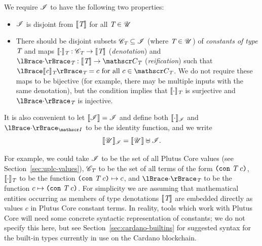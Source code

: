 \medskip
\noindent We require $\mathscr{I}$ to have the following two properties:
\begin{itemize}
\item $\mathscr{I}$ is disjoint from $\llbracket\mathit{\textit{T}}\rrbracket$ for all $\textit{T} \in \mathscr{U}$
\item There should be disjoint subsets $\mathscr{C}_{\textit{T}} \subseteq \mathscr{I}$ (where $\textit{T}
  \in \mathscr{U}$) of \textit{constants of type $\textit{T}$} and maps $\llbracket\mathit{\cdot}\rrbracket_{\textit{T}}:
  \mathscr{C}_{\textit{T}} \rightarrow \llbracket\mathit{\textit{T}}\rrbracket$ (\textit{denotation}) and
  $\reify{\cdot}_{\tn}: \denote{\tn} \rightarrow \Con{\tn}$
  (\textit{reification}) such that $\reify{\denote{c}_{\tn}}_{\tn} = c \text{
    for all } c \in \Con{\tn}$.  We do not require these maps to be bijective
  (for example, there may be multiple inputs with the same denotation), but the
  condition implies that $\llbracket\mathit{\cdot}\rrbracket_{\textit{T}}$ is surjective and
  $\reify{\cdot}_{\tn}$ is injective.
\end{itemize}%
%
%

\noindent It is also convenient to let $\llbracket\mathit{\mathscr{I}}\rrbracket = \mathscr{I}$ and define both
  $\llbracket\mathit{\cdot}\rrbracket_{\mathscr{I}}$ and $\reify{\cdot}_{\Inputs}$ to be the identity
function, and we write
$$
\llbracket\mathit{\mathscr{U}}\rrbracket_{\mathscr{I}} = \llbracket\mathit{\mathscr{U}}\rrbracket \uplus \mathscr{I}.
$$


\noindent For example, we could take $\mathscr{I}$ to be the set of all Plutus Core
values (see Section~\ref{sec:uplc-values}), $\mathscr{C}_{\textit{T}}$ to be the set of all
terms of the form $\texttt{(} \texttt{con} ~ \textit{T} ~ c \texttt{)}$, $\llbracket\mathit{\cdot}\rrbracket_{\textit{T}}$ to be the function
$\texttt{(} \texttt{con} ~ \textit{T} ~ c \texttt{)} \mapsto c$, and $\reify{\cdot}_{\tn}$ to be the function $c
\mapsto \texttt{(} \texttt{con} ~ \textit{T} ~ c \texttt{)}$.  For simplicity we are assuming that mathematical
entities occurring as members of type denotations $\llbracket\mathit{\textit{T}}\rrbracket$ are embedded
directly as values $c$ in Plutus Core constant terms. In reality, tools which
work with Plutus Core will need some concrete syntactic representation of
constants; we do not specify this here, but see
Section~\ref{sec:cardano-builtins} for suggested syntax for the built-in types
currently in use on the Cardano blockchain.

